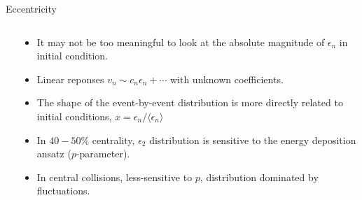 \documentclass[11pt, aspectratio=169]{beamer}
\begin{document}
\begin{frame}{Eccentricity}
\begin{columns}
\begin{column}{.4\textwidth}
\begin{overprint}
\end{overprint}
\end{column}
\begin{column}{.6\textwidth}
\begin{itemize}
\item It may not be too meaningful to look at the absolute magnitude of $\epsilon_n$ in initial condition.
\item Linear reponses $v_n \sim c_n\epsilon_n +\cdots$ with unknown coefficients.\\
\item The shape of the event-by-event distribution is more directly related to initial conditions, $x=\epsilon_n/\langle \epsilon_n \rangle$
\item In $40-50\%$ centrality, $\epsilon_2$ distribution is sensitive to the energy deposition ansatz ($p$-parameter).
\item<2-> In central collisions, less-sensitive to $p$, distribution dominated by fluctuations.
\end{itemize}
\end{column}
\end{columns}
\end{frame}
\end{document}
